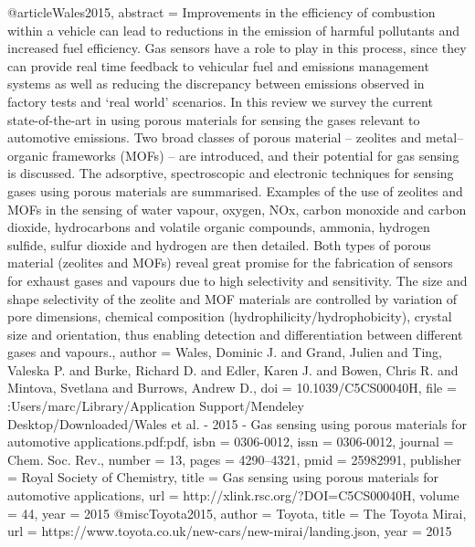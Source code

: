 @article{Wales2015,
abstract = {Improvements in the efficiency of combustion within a vehicle can lead to reductions in the emission of harmful pollutants and increased fuel efficiency. Gas sensors have a role to play in this process, since they can provide real time feedback to vehicular fuel and emissions management systems as well as reducing the discrepancy between emissions observed in factory tests and ‘real world' scenarios. In this review we survey the current state-of-the-art in using porous materials for sensing the gases relevant to automotive emissions. Two broad classes of porous material – zeolites and metal–organic frameworks (MOFs) – are introduced, and their potential for gas sensing is discussed. The adsorptive, spectroscopic and electronic techniques for sensing gases using porous materials are summarised. Examples of the use of zeolites and MOFs in the sensing of water vapour, oxygen, NOx, carbon monoxide and carbon dioxide, hydrocarbons and volatile organic compounds, ammonia, hydrogen sulfide, sulfur dioxide and hydrogen are then detailed. Both types of porous material (zeolites and MOFs) reveal great promise for the fabrication of sensors for exhaust gases and vapours due to high selectivity and sensitivity. The size and shape selectivity of the zeolite and MOF materials are controlled by variation of pore dimensions, chemical composition (hydrophilicity/hydrophobicity), crystal size and orientation, thus enabling detection and differentiation between different gases and vapours.},
author = {Wales, Dominic J. and Grand, Julien and Ting, Valeska P. and Burke, Richard D. and Edler, Karen J. and Bowen, Chris R. and Mintova, Svetlana and Burrows, Andrew D.},
doi = {10.1039/C5CS00040H},
file = {:Users/marc/Library/Application Support/Mendeley Desktop/Downloaded/Wales et al. - 2015 - Gas sensing using porous materials for automotive applications.pdf:pdf},
isbn = {0306-0012},
issn = {0306-0012},
journal = {Chem. Soc. Rev.},
number = {13},
pages = {4290--4321},
pmid = {25982991},
publisher = {Royal Society of Chemistry},
title = {{Gas sensing using porous materials for automotive applications}},
url = {http://xlink.rsc.org/?DOI=C5CS00040H},
volume = {44},
year = {2015}
}
@misc{Toyota2015,
author = {Toyota},
title = {{The Toyota Mirai}},
url = {https://www.toyota.co.uk/new-cars/new-mirai/landing.json},
year = {2015}
}

